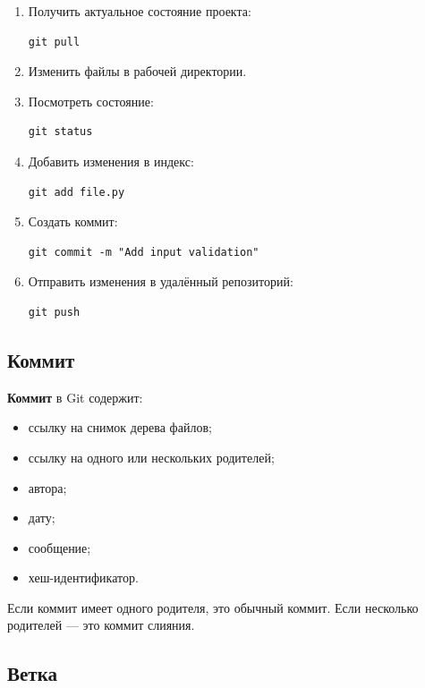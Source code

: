 \documentclass[12pt,a4paper]{article}
\begin{document}
\begin{enumerate}
    \item Получить актуальное состояние проекта:
\begin{lstlisting}
git pull
\end{lstlisting}

    \item Изменить файлы в рабочей директории.

    \item Посмотреть состояние:
\begin{lstlisting}
git status
\end{lstlisting}

    \item Добавить изменения в индекс:
\begin{lstlisting}
git add file.py
\end{lstlisting}

    \item Создать коммит:
\begin{lstlisting}
git commit -m "Add input validation"
\end{lstlisting}

    \item Отправить изменения в удалённый репозиторий:
\begin{lstlisting}
git push
\end{lstlisting}
\end{enumerate}

\subsection{Коммит}

\textbf{Коммит} в Git содержит:

\begin{itemize}
    \item ссылку на снимок дерева файлов;
    \item ссылку на одного или нескольких родителей;
    \item автора;
    \item дату;
    \item сообщение;
    \item хеш-идентификатор.
\end{itemize}

Если коммит имеет одного родителя, это обычный коммит. Если несколько родителей --- это коммит слияния.

\subsection{Ветка}
\end{document}
